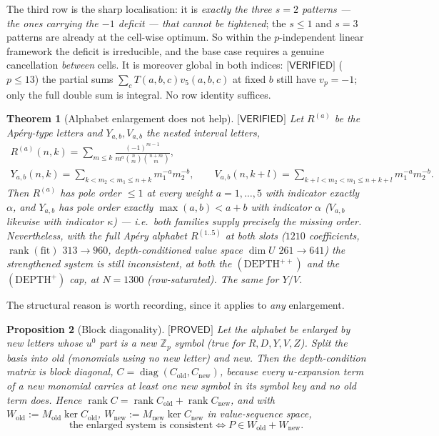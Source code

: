 \documentclass[11pt,reqno]{amsart}
\theoremstyle{plain}
\newtheorem{theorem}{Theorem}[section]
\newtheorem{proposition}[theorem]{Proposition}
\theoremstyle{definition}
\theoremstyle{remark}
\numberwithin{equation}{section}
\newcommand{\ZZ}{\mathbb{Z}}
\newcommand{\Zp}{\ZZ_p}
\newcommand{\rank}{\operatorname{rank}}
\newcommand{\vfive}{v_5}
\newcommand{\PROVED}{\textsf{[PROVED]}}
\newcommand{\VERIFIED}{\textsf{[VERIFIED]}}
\begin{document}
The third row is the sharp localisation: it is \emph{exactly the three $s=2$ patterns --- the
ones carrying the $-1$ deficit --- that cannot be tightened}; the $s\le1$ and $s=3$ patterns
are already at the cell-wise optimum. So within the $p$-independent linear framework the
deficit is irreducible, and the base case requires a genuine cancellation \emph{between} cells.
It is moreover global in both indices: $\VERIFIED$ ($p\le13$) the partial sums
$\sum_cT(a,b,c)\vfive(a,b,c)$ at fixed $b$ still have $v_p=-1$; only the full double sum is
integral. No row identity suffices.

\begin{theorem}[Alphabet enlargement does not help]\label{thm:rletter}
$\VERIFIED$ Let $R^{(a)}$ be the Ap\'ery-type letters and $Y_{a,b},V_{a,b}$ the nested interval
letters,
\[
\begin{gathered}
R^{(a)}(n,k)=\sum_{m\le k}\frac{(-1)^{m-1}}{m^a\binom nm\binom{n+m}{m}},\\
Y_{a,b}(n,k)=\!\!\sum_{k<m_2<m_1\le n+k}\!\! m_1^{-a}m_2^{-b},\qquad
V_{a,b}(n,k+l)=\!\!\sum_{k+l<m_2<m_1\le n+k+l}\!\! m_1^{-a}m_2^{-b}.
\end{gathered}
\]
Then $R^{(a)}$ has pole order $\le1$ at every weight $a=1,\dots,5$ with indicator exactly
$\alpha$, and $Y_{a,b}$ has pole order exactly $\max(a,b)<a+b$ with indicator $\alpha$
\textup{(}$V_{a,b}$ likewise with indicator $\kappa$\textup{)} --- i.e.\ both families supply
precisely the missing order. Nevertheless, with the full Ap\'ery alphabet $R^{(1..5)}$ at both
slots ($1210$ coefficients, $\rank(\mathrm{fit})$ $313\to960$, depth-conditioned value space
$\dim U$ $261\to641$) the strengthened system is \emph{still inconsistent}, at both the
$(\mathrm{DEPTH}^{++})$ and the $(\mathrm{DEPTH}^{+})$ cap, at $N=1300$ (row-saturated). The
same for $Y/V$.
\end{theorem}

The structural reason is worth recording, since it applies to \emph{any} enlargement.

\begin{proposition}[Block diagonality]\label{prop:blockdiag}
$\PROVED$ Let the alphabet be enlarged by new letters whose $u^0$ part is a \emph{new} $\Zp$
symbol (true for $R,D,Y,V,Z$). Split the basis into \emph{old} (monomials using no new letter)
and \emph{new}. Then the depth-condition matrix is block diagonal,
$C=\operatorname{diag}(C_{\mathrm{old}},C_{\mathrm{new}})$, because every $u$-expansion term of
a new monomial carries at least one new symbol in its symbol key and no old term does. Hence
$\rank C=\rank C_{\mathrm{old}}+\rank C_{\mathrm{new}}$, and with
$W_{\mathrm{old}}:=M_{\mathrm{old}}\ker C_{\mathrm{old}}$,
$W_{\mathrm{new}}:=M_{\mathrm{new}}\ker C_{\mathrm{new}}$ in value-sequence space,
\[
\text{the enlarged system is consistent}\iff P\in W_{\mathrm{old}}+W_{\mathrm{new}} .
\]
\end{proposition}
\end{document}
